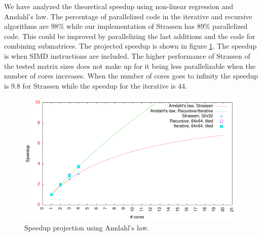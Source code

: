 We have analyzed the theoretical speedup using non-linear regression and Amdahl's law. The percentage of parallelized code in the iterative and recursive algorithms are 98\% while our implementation of Strassen has 89\% parallelized code. This could be improved by parallelizing the last additions and the code for combining submatrices. The projected speedup is shown in figure \ref{fig:amdahl}. The speedup is when SIMD instructions are included. The higher performance of Strassen of the tested matrix sizes does not make up for it being less parallelizable when the number of cores increases. When the number of cores goes to infinity the speedup is 9.8 for Strassen while the speedup for the iterative is 44.

\begin{figure}[h!]
  \centering
  \includegraphics[width=\textwidth]{"../project2/gnuplots/amdahl"}
  \caption{Speedup projection using Amdahl's law.}
  \label{fig:amdahl}
\end{figure}
